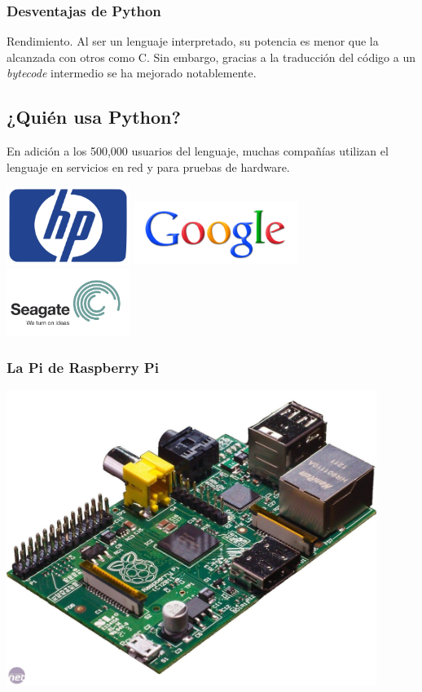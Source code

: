 \documentclass{beamer}
\begin{document}
\begin{frame}
\frametitle{Desventajas de Python}
Rendimiento.
Al ser un lenguaje interpretado, su potencia es menor que la alcanzada con otros como C. Sin embargo, gracias a la traducción del código a un \textit{bytecode} intermedio se ha mejorado notablemente.
\end{frame}

\subsection{¿Quién usa Python?}
\begin{frame}
\begin{block}{}
En adición a los 500,000 usuarios del lenguaje, muchas compañías utilizan el lenguaje en servicios en red y para pruebas de hardware.
\end{block}
\begin{block}{}
\includegraphics[width=0.3\textwidth]{hp.jpg}
\includegraphics[width=0.4\textwidth]{google.png}
\includegraphics[width=0.3\textwidth]{seagate.jpeg}
\end{block}
\end{frame}

\begin{frame}
\frametitle{La Pi de Raspberry Pi}
\includegraphics[width=0.9\textwidth]{pi.jpg}
\end{frame}
\end{document}
